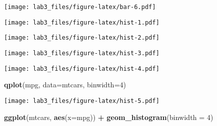 \documentclass[
]{article}
\newenvironment{Shaded}{\begin{snugshade}}{\end{snugshade}}
\newcommand{\DataTypeTok}[1]{\textcolor[rgb]{0.13,0.29,0.53}{#1}}
\newcommand{\DecValTok}[1]{\textcolor[rgb]{0.00,0.00,0.81}{#1}}
\newcommand{\KeywordTok}[1]{\textcolor[rgb]{0.13,0.29,0.53}{\textbf{#1}}}
\newcommand{\NormalTok}[1]{#1}
\newcommand{\OperatorTok}[1]{\textcolor[rgb]{0.81,0.36,0.00}{\textbf{#1}}}
\newcommand{\StringTok}[1]{\textcolor[rgb]{0.31,0.60,0.02}{#1}}
\begin{document}
\texttt{[image: lab3\_files/figure-latex/bar-6.pdf]}

\begin{Shaded}
\end{Shaded}

\texttt{[image: lab3\_files/figure-latex/hist-1.pdf]}

\begin{Shaded}
\end{Shaded}

\texttt{[image: lab3\_files/figure-latex/hist-2.pdf]}

\begin{Shaded}
\end{Shaded}

\texttt{[image: lab3\_files/figure-latex/hist-3.pdf]}

\begin{Shaded}
\end{Shaded}

\texttt{[image: lab3\_files/figure-latex/hist-4.pdf]}

\begin{Shaded}
\begin{Highlighting}[]
\KeywordTok{qplot}\NormalTok{(mpg, }\DataTypeTok{data=}\NormalTok{mtcars, }\DataTypeTok{binwidth=}\DecValTok{4}\NormalTok{)}
\end{Highlighting}
\end{Shaded}

\texttt{[image: lab3\_files/figure-latex/hist-5.pdf]}

\begin{Shaded}
\begin{Highlighting}[]
\KeywordTok{ggplot}\NormalTok{(mtcars, }\KeywordTok{aes}\NormalTok{(}\DataTypeTok{x=}\NormalTok{mpg)) }\OperatorTok{+}\StringTok{ }\KeywordTok{geom_histogram}\NormalTok{(}\DataTypeTok{binwidth =} \DecValTok{4}\NormalTok{)}
\end{Highlighting}
\end{Shaded}
\end{document}

